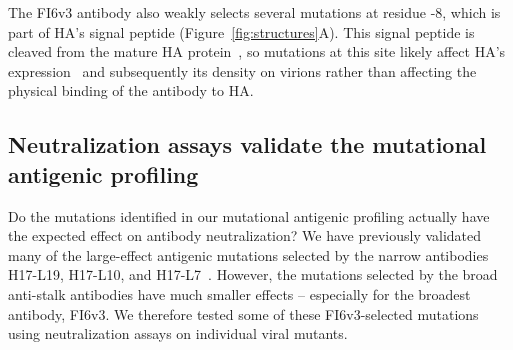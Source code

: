 \documentclass[11pt]{article}
\begin{document}
The FI6v3 antibody also weakly selects several mutations at residue -8, which is part of HA's signal peptide (Figure~\ref{fig:structures}A). 
This signal peptide is cleaved from the mature HA protein~\citep{daniels2003n,burke2014recommended}, so mutations at this site likely affect HA's expression~\citep{nordholm2017translational} and subsequently its density on virions rather than affecting the physical binding of the antibody to HA.

\subsection*{Neutralization assays validate the mutational antigenic profiling}
Do the mutations identified in our mutational antigenic profiling actually have the expected effect on antibody neutralization?
We have previously validated many of the large-effect antigenic mutations selected by the narrow antibodies H17-L19, H17-L10, and H17-L7~\citep{doud2017complete}.
However, the mutations selected by the broad anti-stalk antibodies have much smaller effects -- especially for the broadest antibody, FI6v3.
We therefore tested some of these FI6v3-selected mutations using neutralization assays on individual viral mutants.
\end{document}
